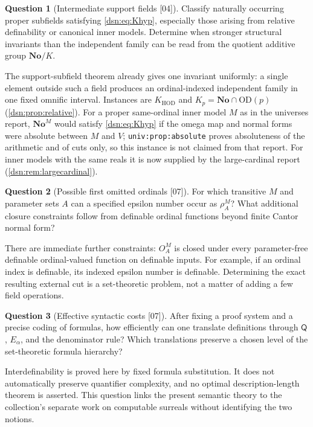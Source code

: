 \documentclass[11pt,a4paper]{article}
\numberwithin{equation}{section}
\theoremstyle{definition}
\newtheorem{question}[question]{Question}
\theoremstyle{remark}
\newcommand{\No}{\mathbf{No}}
\newcommand{\OD}{\mathrm{OD}}
\newcommand{\HOD}{\mathrm{HOD}}
\newcommand{\Mc}{\mathsf Q}
\newcommand{\KH}{K_{\HOD}}
\newcommand{\src}[1]{\textup{\textsf{\small[#1]}}}
\newcommand{\lbl}[1]{\nolinkurl{#1}}
\begin{document}
\begin{question}[Intermediate support fields \src{04}]\label{dsn:q:support}
Classify naturally occurring proper subfields satisfying
\eqref{dsn:eq:Khyp}, especially those arising from relative definability
or canonical inner models. Determine when stronger structural
invariants than the independent family can be read from the
quotient additive group $\No/K$.
\end{question}
The support-subfield theorem already gives one invariant uniformly:
a single element outside such a field produces an ordinal-indexed
independent family in one fixed omnific interval. Instances are $\KH$ and
$K_p=\No\cap\OD(p)$ (\cref{dsn:prop:relative}). For a proper same-ordinal
inner model $M$ as in the universes report, $\No^M$ would satisfy
\eqref{dsn:eq:Khyp} if the omega map and normal forms were absolute between
$M$ and $V$; \lbl{univ:prop:absolute} proves absoluteness of the arithmetic
and of cuts only, so this instance is not claimed from that report. For
inner models with the same reals it is now supplied by the large-cardinal
report (\cref{dsn:rem:largecardinal}).

\begin{question}[Possible first omitted ordinals \src{07}]\label{dsn:q:rho}
For which transitive $M$ and parameter sets $A$ can a specified epsilon
number occur as $\rho^M_A$? What additional closure constraints follow
from definable ordinal functions beyond finite Cantor normal form?
\end{question}
There are immediate further constraints: $O^M_A$ is closed under every
parameter-free definable ordinal-valued function on definable inputs. For
example, if an ordinal index is definable, its indexed epsilon number is
definable. Determining the exact resulting external cut is a set-theoretic
problem, not a matter of adding a few field operations.

\begin{question}[Effective syntactic costs \src{07}]\label{dsn:q:cost}
After fixing a proof system and a precise coding of formulas, how
efficiently can one translate definitions through $\Mc$, $E_\alpha$, and the
denominator rule? Which translations preserve a chosen level of the
set-theoretic formula hierarchy?
\end{question}
Interdefinability is proved here by fixed formula substitution. It does
not automatically preserve quantifier complexity, and no optimal
description-length theorem is asserted. This question links the present
semantic theory to the collection's separate work on computable surreals
without identifying the two notions.
\end{document}

